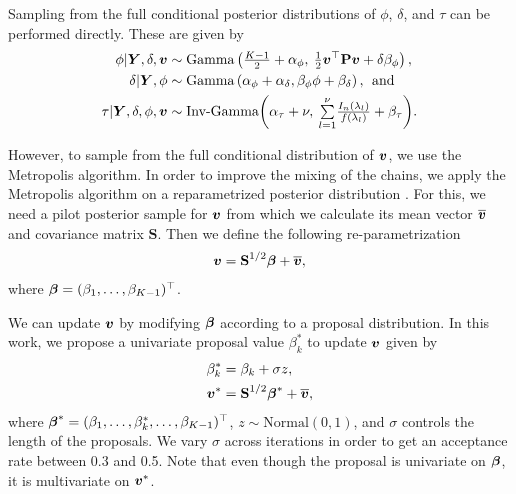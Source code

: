 \documentclass[twocolumn,final]{svjour3}
\newcommand{\bm}[1]{\mbox{\boldmath $#1$}}
\begin{document}
Sampling from the full conditional posterior distributions of $\phi$, $\delta$, and $\tau$ can be performed directly. These are given by
\begin{align*}
\phi|\bm{Y},\delta,\bm{v} &\sim \text{Gamma}\left(\tfrac{K-1}{2} + \alpha_{\phi},\: \tfrac{1}{2} \bm{v}^\top \textbf{P} \bm{v} + \delta \beta_{\phi} \right), \\
\delta|\bm{Y},\phi  &\sim \text{Gamma}\left(\alpha_{\phi} + \alpha_{\delta}, \beta_{\phi} \phi + \beta_{\delta}\right),\:\: \text{and}\\
\tau|\bm{Y},\delta, \phi,\bm{v}   &\sim \text{Inv-Gamma}\!\left(\alpha_{\tau}+ \nu,\:  {\textstyle\sum\limits_{l=1}^{\nu}} \tfrac{I_n(\lambda_l)}{f(\lambda_l)} + \beta_{\tau} \right)\!.
\end{align*}

However, to sample from the full conditional distribution of $\bm{v}$, we use the Metropolis algorithm.
In order to improve the mixing of the chains, we apply the Metropolis algorithm on a reparametrized posterior distribution \citep{Lambert:2007}.  For this, we need a pilot posterior sample for $\bm{v}$ from which we calculate its mean vector $\bm{\overline{v}}$ and covariance matrix $\textbf{S}$.  Then we define the following re-parametrization
\begin{align*}
\bm{v} = \textbf{S}^{1/2} \bm{\beta} + \overline{\bm{v}},
\end{align*}
where $\bm{\beta}=(\beta_1, \dots, \beta_{K-1})^\top$.

We can update $\bm{v}$ by modifying $\bm{\beta}$ according to a proposal distribution.  In this work, we propose a univariate proposal value $\beta_{k}^{*}$ to update $\bm{v}$ given by
\begin{align*}
\beta_{k}^{*} &= \beta_{k} + \sigma z,\\
\bm{v}^{*} &= \textbf{S}^{1/2}\bm{\beta}^{*} + \overline{\bm{v}}, 
\end{align*}
where $\bm{\beta}^{*}= (\beta_1, \dots, \beta_{k}^{*} ,\dots, \beta_{K-1})^\top$, $z \sim \text{Normal}(0,1)$, and $\sigma$ controls the length of the proposals.  We vary $\sigma$ across iterations in order to get an acceptance rate between 0.3 and 0.5.  Note that even though the proposal is univariate on $\bm{\beta}$, it is multivariate on $\bm{v}^*$.
\end{document}
